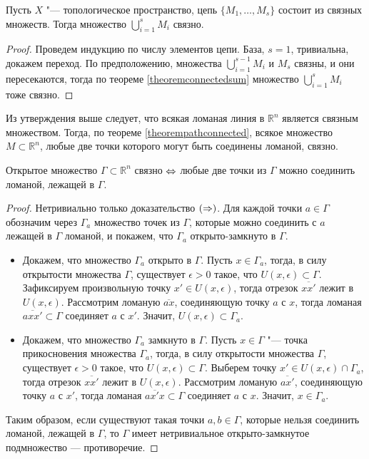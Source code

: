 \begin{proposition}
	Пусть $X$ "--- топологическое пространство, цепь $\{M_1,\ldots, M_s\}$ состоит из связных множеств. Тогда множество $\bigcup_{i=1}^s M_i$ связно.
\end{proposition}

\begin{proof}
	Проведем индукцию по числу элементов цепи. База, $s = 1$, тривиальна, докажем переход. По предположению, множества $\bigcup_{i=1}^{s-1} M_i$ и $M_s$ связны, и они пересекаются, тогда по теореме \ref{theoremconnectedsum} множество $\bigcup_{i=1}^s M_i$ тоже связно.
\end{proof}

\begin{note}
	Из утверждения выше следует, что всякая ломаная линия в $\mathbb{R}^n$ является связным множеством. Тогда, по теореме \ref{theorempathconnected}, всякое множество $M\subset \mathbb{R}^n$, любые две точки которого могут быть соединены ломаной, связно.
\end{note}

\begin{theorem}
	Открытое множество $\Gamma \subset \mathbb{R}^n$ связно $\Leftrightarrow$ любые две точки из $\Gamma$ можно соединить ломаной, лежащей в $\Gamma$.
\end{theorem}

\begin{proof}
	Нетривиально только доказательство $(\Rightarrow)$. Для каждой точки $a \in \Gamma$ обозначим через $\Gamma_a$ множество точек из $\Gamma$, которые можно соединить с $a$ лежащей в $\Gamma$ ломаной, и покажем, что $\Gamma_a$ открыто-замкнуто в $\Gamma$.
	\begin{itemize}
		\item Докажем, что множество $\Gamma_a$ открыто в $\Gamma$. Пусть $x \in \Gamma_a$, тогда, в силу открытости множества $\Gamma$, существует $\epsilon>0$ такое, что $U(x,\epsilon) \subset \Gamma$. Зафиксируем произвольную точку $x' \in U(x, \epsilon)$, тогда отрезок $\overline{xx'}$ лежит в $U(x, \epsilon)$. Рассмотрим ломаную $\overline{ax}$, соединяющую точку $a$ с $x$, тогда ломаная $\overline{axx'} \subset \Gamma$ соединяет $a$ с $x'$. Значит, $U(x, \epsilon)\subset \Gamma_a$.
		
		\item Докажем, что множество $\Gamma_a$ замкнуто в $\Gamma$. Пусть $x \in \Gamma$ "--- точка прикосновения множества $\Gamma_a$, тогда, в силу открытости множества $\Gamma$, существует $\epsilon>0$ такое, что $U(x,\epsilon) \subset \Gamma$. Выберем точку $x' \in U(x,\epsilon) \cap \Gamma_a$, тогда отрезок $\overline{xx'}$ лежит в $U(x, \epsilon)$. Рассмотрим ломаную $\overline{ax'}$, соединяющую точку $a$ с $x'$, тогда ломаная $\overline{ax'x} \subset \Gamma$ соединяет $a$ с $x$. Значит, $x \in \Gamma_a$.
	\end{itemize}
	
	Таким образом, если существуют такая точки $a, b \in \Gamma$, которые нельзя соединить ломаной, лежащей в $\Gamma$, то $\Gamma$ имеет нетривиальное открыто-замкнутое подмножество --- противоречие.
\end{proof}

